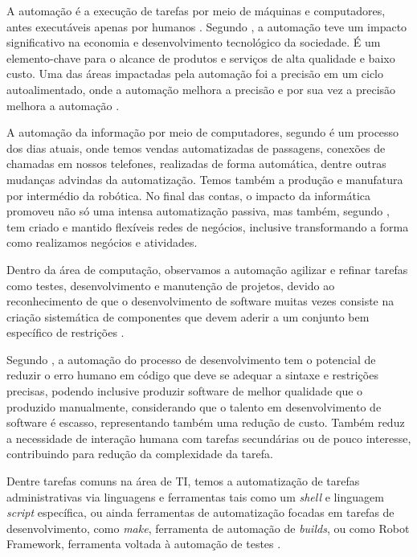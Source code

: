 \documentclass[tg]{mdtufsm}
\begin{document}
            A automação é a execução de tarefas por meio de máquinas e computadores, antes executáveis apenas por humanos \cite{automationlevels}. Segundo \citeauthor{automation2009} \cite[pág. 124]{automation2009}, a automação teve um impacto significativo na economia e desenvolvimento tecnológico da sociedade. É um elemento-chave para o alcance de produtos e serviços de alta qualidade e baixo custo. Uma das áreas impactadas pela automação foi a precisão em um ciclo autoalimentado, onde a automação melhora a precisão e por sua vez a precisão melhora a automação \cite{auto2008precision}.

        	A automação da informação por meio de computadores, segundo \citeauthor{automation2009} \cite[pág. 3]{automation2009} é um processo dos dias atuais, onde temos vendas automatizadas de passagens, conexões de chamadas em nossos telefones, realizadas de forma automática, dentre outras mudanças advindas da automatização. Temos também a produção e manufatura por intermédio da robótica. No final das contas, o impacto da informática promoveu não só uma intensa automatização passiva, mas também, segundo \citeauthor{itEnabledBusiness}\cite{itEnabledBusiness}, tem criado e mantido flexíveis redes de negócios, inclusive transformando a forma como realizamos negócios e atividades.

        	Dentro da área de computação, observamos a automação agilizar e refinar tarefas como testes, desenvolvimento e manutenção de projetos, devido ao reconhecimento de que o desenvolvimento de software muitas vezes consiste na criação sistemática de componentes que devem aderir a um conjunto bem específico de restrições \cite{automionSoftEvolutionEffect}.

        	Segundo \citeauthor{automionSoftEvolutionEffect}\cite{automionSoftEvolutionEffect}, a automação do processo de desenvolvimento tem o potencial de reduzir o erro humano em código que deve se adequar a sintaxe e restrições precisas, podendo inclusive produzir software de melhor qualidade que o produzido manualmente, considerando que o talento em desenvolvimento de software é escasso, representando também uma redução de custo.
        	Também reduz a necessidade de interação humana com tarefas secundárias ou de pouco interesse, contribuindo para redução da complexidade da tarefa.

        	Dentre tarefas comuns na área de TI, temos a automatização de tarefas administrativas via linguagens e ferramentas tais como um \emph{shell} e linguagem \emph{script} específica, ou ainda ferramentas de automatização focadas em tarefas de desenvolvimento, como \emph{make}, ferramenta de automação de \emph{builds}, ou como Robot Framework, ferramenta voltada à automação de testes \cite{shell,make,robotFW}.
\end{document}
